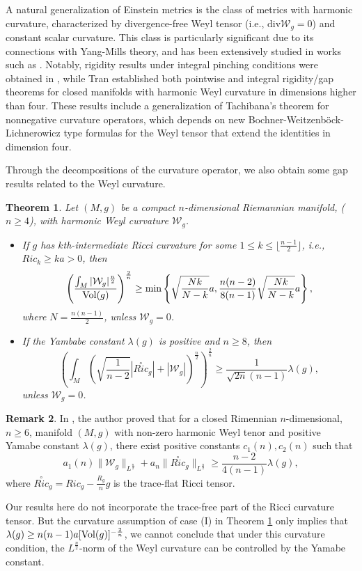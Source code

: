 \documentclass[12pt, twoside]{article}
\newtheorem{theorem}{Theorem}[section]
\theoremstyle{definition}
\newtheorem{remark}[theorem]{Remark}
\numberwithin{equation}{section}
\def \la {\lambda}
\begin{document}
	A natural generalization of Einstein metrics is the class of metrics with harmonic curvature, characterized by divergence-free Weyl tensor (i.e., $\text{div}\mathcal{W}_{g} = 0$) and constant scalar curvature. This class is particularly significant due to its connections with Yang-Mills theory, and has been extensively studied in works such as \cite{Der77,Fu17,HV97,IS02,Kim11,Tru68}. Notably, rigidity results under integral pinching conditions were obtained in \cite{Fu17,HV97}, while Tran \cite{Tra17} established both pointwise and integral rigidity/gap theorems for closed manifolds with harmonic Weyl curvature in dimensions higher than four. These results include a generalization of Tachibana's theorem for nonnegative curvature operators, which depends on new Bochner-Weitzenb\"{o}ck-Lichnerowicz type formulas for the Weyl tensor that extend the identities in dimension four. 
	
	Through the decompositions of the curvature operator, we also obtain some gap results related to the Weyl curvature.
	
\begin{theorem}\label{T1}
	Let $(M,g)$ be a compact $n$-dimensional Riemannian manifold, ($n \geq 4$), with harmonic Weyl curvature $\mathcal{W}_{g}$.
	\begin{itemize}
		\item [(1)] If $g$ has $k$th-intermediate
		Ricci curvature for some $1 \leq k \leq \lfloor\frac{n-1}{2}\rfloor$, i.e., $Ric_{k}\geq ka>0$, then 
	$$\left(\frac{\int_{M}|\mathcal{W}_{g}|^{\frac{n}{2}}}{{\rm{Vol}}(g)}\right)^{\frac{2}{n}}\geq\min\left\{\sqrt{\frac{Nk}{N-k}}a,\frac{n(n-2)}{8(n-1)}\sqrt{\frac{Nk}{N-k}}a \right\},$$
where $N=\frac{n(n-1)}{2}$, unless $\mathcal{W}_{g}=0$.			
		\item [(2)] If the Yambabe constant $\la(g)$ is positive and $n\geq8$, then 	$$ \left(\int_{M}\left(\sqrt{\frac{ 1}{n-2}}|\overset{\circ}{Ric}_{g}|+|\mathcal{W}_{g}|\right)^{\frac{n}{2}}\right)^{\frac{2}{n} }\geq \frac{1}{\sqrt{2n}(n-1)}\la(g),$$
		unless $\mathcal{W}_{g}=0$.
	\end{itemize} 
\end{theorem}

\begin{remark}
In \cite{Tra17}, the author proved that for a closed Rimennian $n$-dimensional, $n\geq6$, manifold $(M,g)$ with non-zero harmonic Weyl tenor and positive Yamabe constant $\la(g)$, there exist positive constants $c_{1}(n), c_{2}(n)$ such that
$$a_{1}(n)\|\mathcal{W}_{g}\|_{L^{\frac{n}{2} }}+a_{n}\|\overset{\circ}{Ric}_{g}\|_{L^{\frac{n}{2} }}\geq\frac{n-2}{4(n-1)}\la(g),$$
where $\overset{\circ}{Ric}_{g}=Ric_{g}-\frac{R_{g}}{n}g$ is the trace-flat Ricci tensor.

Our results here do not incorporate the trace-free part of the Ricci curvature tensor. But the curvature assumption of case (I) in Theorem \ref{T1} only implies that $\la(g)\geq n(n-1)a[{\rm{Vol}}(g)]^{-\frac{2}{n}}$, we cannot conclude that under this curvature condition, the $L^{\frac{n}{2}}$-norm of the Weyl curvature can be controlled by the Yamabe constant. 
\end{remark}
\end{document}
